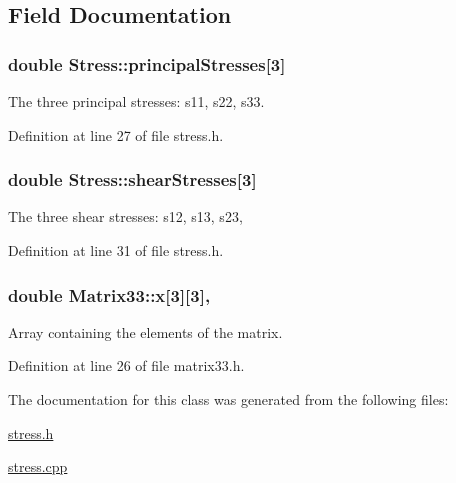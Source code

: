 \subsection{Field Documentation}
\hypertarget{classStress_aea8c3e40aa59a89d7ba79d2c916050a6}{
\subsubsection[{principal\-Stresses}]{\setlength{\rightskip}{0pt plus 5cm}double Stress\-::principal\-Stresses\mbox{[}3\mbox{]}\hspace{0.3cm}{\ttfamily [protected]}}}\label{d1/d1c/classStress_aea8c3e40aa59a89d7ba79d2c916050a6}
The three principal stresses\-: s11, s22, s33. 

Definition at line 27 of file stress.\-h.

\hypertarget{classStress_a77e8705e56c2fb56826a638edf3f78bf}{
\subsubsection[{shear\-Stresses}]{\setlength{\rightskip}{0pt plus 5cm}double Stress\-::shear\-Stresses\mbox{[}3\mbox{]}\hspace{0.3cm}{\ttfamily [protected]}}}\label{d1/d1c/classStress_a77e8705e56c2fb56826a638edf3f78bf}
The three shear stresses\-: s12, s13, s23, 

Definition at line 31 of file stress.\-h.

\hypertarget{classMatrix33_af7f01fa466616eb7c8eda2e4d9f85cdd}{
\subsubsection[{x}]{\setlength{\rightskip}{0pt plus 5cm}double Matrix33\-::x\mbox{[}3\mbox{]}\mbox{[}3\mbox{]}\hspace{0.3cm}{\ttfamily [protected]}, {\ttfamily [inherited]}}}\label{de/d82/classMatrix33_af7f01fa466616eb7c8eda2e4d9f85cdd}


Array containing the elements of the matrix. 



Definition at line 26 of file matrix33.\-h.



The documentation for this class was generated from the following files\-:\begin{DoxyCompactItemize}
\item 
\hyperlink{stress_8h}{stress.\-h}\item 
\hyperlink{stress_8cpp}{stress.\-cpp}\end{DoxyCompactItemize}
